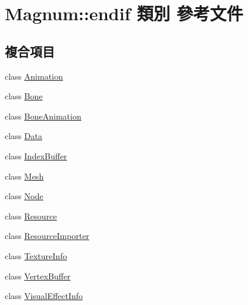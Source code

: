 \hypertarget{class_magnum_1_1endif}{}\section{Magnum\+:\+:endif 類別 參考文件}
\label{class_magnum_1_1endif}
\subsection*{複合項目}
\begin{DoxyCompactItemize}
\item 
class \hyperlink{class_magnum_1_1endif_1_1_animation}{Animation}
\item 
class \hyperlink{class_magnum_1_1endif_1_1_bone}{Bone}
\item 
class \hyperlink{class_magnum_1_1endif_1_1_bone_animation}{Bone\+Animation}
\item 
class \hyperlink{class_magnum_1_1endif_1_1_data}{Data}
\item 
class \hyperlink{class_magnum_1_1endif_1_1_index_buffer}{Index\+Buffer}
\item 
class \hyperlink{class_magnum_1_1endif_1_1_mesh}{Mesh}
\item 
class \hyperlink{class_magnum_1_1endif_1_1_node}{Node}
\item 
class \hyperlink{class_magnum_1_1endif_1_1_resource}{Resource}
\item 
class \hyperlink{class_magnum_1_1endif_1_1_resource_importer}{Resource\+Importer}
\item 
class \hyperlink{class_magnum_1_1endif_1_1_texture_info}{Texture\+Info}
\item 
class \hyperlink{class_magnum_1_1endif_1_1_vertex_buffer}{Vertex\+Buffer}
\item 
class \hyperlink{class_magnum_1_1endif_1_1_visual_effect_info}{Visual\+Effect\+Info}
\end{DoxyCompactItemize}
